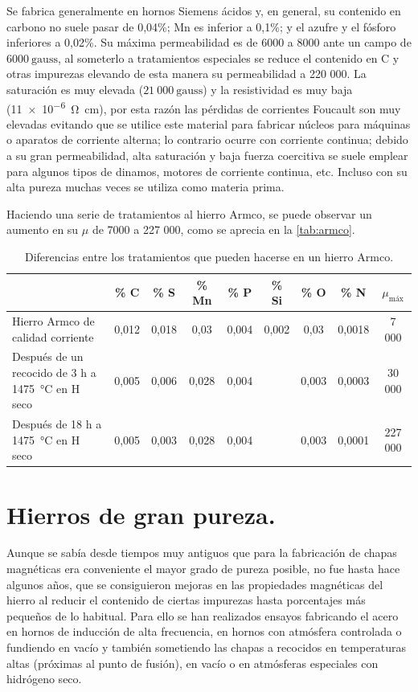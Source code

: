 \documentclass[12pt,a4paper]{article}
\begin{document}
Se fabrica generalmente en hornos Siemens ácidos y, en general, su contenido en carbono no suele pasar de 0,04\%; Mn es inferior a 0,1\%; y el azufre y el fósforo inferiores a 0,02\%. Su máxima permeabilidad es de 6000 a 8000 ante un campo de $6000\ \mathrm{gauss}$, al someterlo a tratamientos especiales se reduce el contenido en C y otras impurezas elevando de esta manera su permeabilidad a 220 000. La saturación es muy elevada ($21\ 000\ \mathrm{gauss}$) y la resistividad es muy baja (\SI{11e-6}{\ohm\centi\metre}), por esta razón las pérdidas de corrientes Foucault son muy elevadas evitando que se utilice este material para fabricar núcleos para máquinas o aparatos de corriente alterna; lo contrario ocurre con corriente continua; debido a su gran permeabilidad, alta saturación y baja fuerza coercitiva se suele emplear para algunos tipos de dinamos, motores de corriente continua, etc. Incluso con su alta pureza muchas veces se utiliza como materia prima.

Haciendo una serie de tratamientos al hierro Armco, se puede observar un aumento en su $\mu$ de 7000 a 227 000, como se aprecia en la \autoref{tab:armco}.

\begin{table}[H]
    \centering
    \begin{tabularx}{\textwidth}{X|c|c|c|c|c|c|c|c}
        & \% C & \% S & \% Mn & \% P & \% Si & \% O & \% N & $\mu_{\text{máx}}$ \\ \hline
        Hierro Armco de calidad corriente & 0,012 & 0,018 & 0,03 & 0,004 & 0,002 & 0,03 & 0,0018 & 7 000 \\
        Después de un recocido de 3 h a \SI{1475}{\celsius} en H seco & 0,005 & 0,006 & 0,028 & 0,004 &  & 0,003 & 0,0003 & 30 000 \\
        Después de 18 h a \SI{1475}{\celsius} en H seco & 0,005 & 0,003 & 0,028 & 0,004 &  & 0,003 & 0,0001 & 227 000 \\
    \end{tabularx}
    \caption{Diferencias entre los tratamientos que pueden hacerse en un hierro Armco.}
    \label{tab:armco}
\end{table}

\section{Hierros de gran pureza.}

Aunque se sabía desde tiempos muy antiguos que para la fabricación de chapas magnéticas era conveniente el mayor grado de pureza posible, no fue hasta hace algunos años, que se consiguieron mejoras en las propiedades magnéticas del hierro al reducir el contenido de ciertas impurezas hasta porcentajes más pequeños de lo habitual. Para ello se han realizados ensayos fabricando el acero en hornos de inducción de alta frecuencia, en hornos con atmósfera controlada o fundiendo en vacío y también sometiendo las chapas a recocidos en temperaturas altas (próximas al punto de fusión), en vacío o en atmósferas especiales con hidrógeno seco. 
\end{document}
